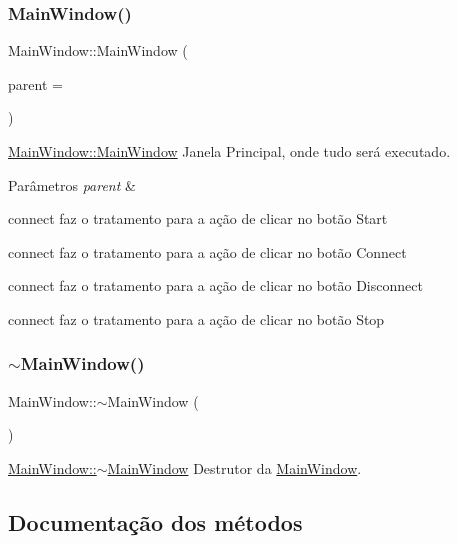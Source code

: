 \subsubsection{\texorpdfstring{Main\+Window()}{MainWindow()}}
{\footnotesize\ttfamily Main\+Window\+::\+Main\+Window (\begin{DoxyParamCaption}\item[{Q\+Widget $\ast$}]{parent = {} }\end{DoxyParamCaption})\hspace{0.3cm}{\ttfamily [explicit]}}



\hyperlink{classMainWindow_a8b244be8b7b7db1b08de2a2acb9409db}{Main\+Window\+::\+Main\+Window} Janela Principal, onde tudo será executado. 


\begin{DoxyParams}{Parâmetros}
{\em parent} & \\
\hline
\end{DoxyParams}
connect faz o tratamento para a ação de clicar no botão \textquotesingle{}Start\textquotesingle{}

connect faz o tratamento para a ação de clicar no botão \textquotesingle{}Connect\textquotesingle{}

connect faz o tratamento para a ação de clicar no botão \textquotesingle{}Disconnect\textquotesingle{}

connect faz o tratamento para a ação de clicar no botão \textquotesingle{}Stop\textquotesingle{}\mbox{\label{classMainWindow_ae98d00a93bc118200eeef9f9bba1dba7}} 
\subsubsection{\texorpdfstring{$\sim$\+Main\+Window()}{~MainWindow()}}
{\footnotesize\ttfamily Main\+Window\+::$\sim$\+Main\+Window (\begin{DoxyParamCaption}{ }\end{DoxyParamCaption})}



\hyperlink{classMainWindow_ae98d00a93bc118200eeef9f9bba1dba7}{Main\+Window\+::$\sim$\+Main\+Window} Destrutor da \hyperlink{classMainWindow}{Main\+Window}. 



\subsection{Documentação dos métodos}
\mbox{\label{classMainWindow_afdfeb13ec363b0eb8ecacaf0aa13b605}} 
